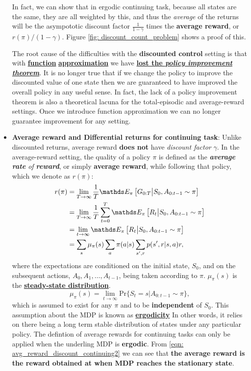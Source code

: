 \documentclass[11pt]{article}
\begin{document}
\begin{itemize}
In fact, we can show that in ergodic continuing task, because all states are the same, they are all weighted by this, and thus the \emph{average} of the returns will be the asympototic discount factor $\frac{1}{1-\gamma}$ times the \textbf{average reward}, or $r(\pi)/(1-\gamma)$.  Figure \ref{fig: discount_count_problem} shows a proof of this. 

The root cause of the difficulties with the \textbf{discounted control} setting is that with \underline{\textbf{function}} \underline{\textbf{approximation}} we have \underline{\textbf{lost the \emph{policy improvement theorem}}}. It is no longer true that if we change the policy to improve the discounted value of one state then we are guaranteed to have improved the overall policy in any useful sense. In fact, the lack of a policy improvement theorem is also a theoretical lacuna for the total-episodic and average-reward settings. Once we introduce function approximation we can no longer guarantee improvement for any setting.



\item \textbf{Average reward and Differential returns for continuing task}: Unlike discounted returns, average reward \textbf{does not} have \emph{discount factor} $\gamma$. In the average-reward setting, the quality of a policy $\pi$ is defined as the \emph{\textbf{average rate} of \textbf{reward}}, or simply \textbf{average reward}, while following that policy, which we denote as $r(\pi)$:
\begin{align}
r(\pi) &= \lim_{T\rightarrow \infty}\frac{1}{T}\E{\pi}{G_{0:T} \big| S_{0}, A_{0:t-1} \sim \pi} \nonumber\\
 &=\lim_{T\rightarrow \infty}\frac{1}{T}\sum_{t=0}^{T}\E{\pi}{R_{t} \big| S_{0}, A_{0:t-1} \sim \pi}  \label{eqn: avg_reward_discount_continuing}\\
&= \lim_{t\rightarrow \infty}\E{\pi}{R_{t} \big| S_{0}, A_{0:t-1} \sim \pi}  \label{eqn: avg_reward_discount_continuing2}\\
&= \sum_{s}\mu_{\pi}(s)\sum_{a}\pi(a|s) \sum_{s', r}p(s', r| s, a)r,  \label{eqn: avg_reward_discount_continuing3}
\end{align}  where the expectations are conditioned on the initial state, $S_0$, and on the subsequent actions, $A_0, A_1, \ldots, A_{t-1}$, being taken according to $\pi$. $\mu_{\pi}(s)$ is the \underline{\textbf{steady-state distribution}}. $$\mu_{\pi}(s) = \lim_{t\rightarrow \infty} \text{Pr}\{S_t =s |A_{0:t-1} \sim \pi\},$$ which is assumed to exist for any $\pi$ and to be \textbf{independent} of $S_0$. This assumption about the MDP is known as \underline{\textbf{ergodicity}}  In other words, it relies on there being a long term stable distribution of states under any particular policy. The defintion of average rewards for continuing tasks can only be applied when the underling MDP is \textbf{ergodic}.  From \eqref{eqn: avg_reward_discount_continuing2} we can see that \textbf{the average reward is the reward obtained at when MDP reaches the stationary state}.


\end{itemize}
\end{document}
